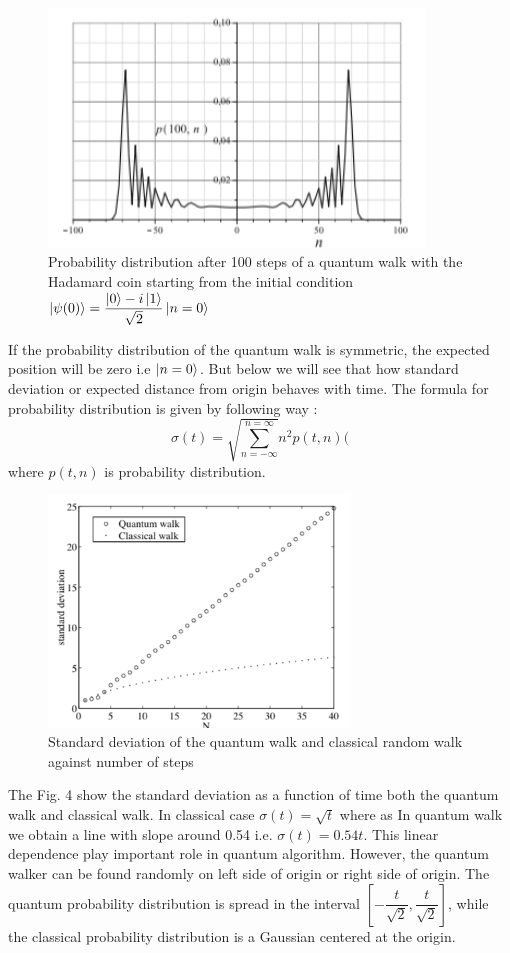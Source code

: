 \documentclass[11 pt]{article}
\theoremstyle{definition}
\theoremstyle{remark}
\newcommand{\di}{i}
\begin{document}
\begin{figure}[htp]
    \centering
    \includegraphics[width = 10cm]{Line_symmetric.png}
    \caption{Probability distribution after 100 steps of a quantum walk with the Hadamard coin starting from the initial condition $\ket{\psi(0)} = \dfrac{\ket{0}- \di\ket{1}}{\sqrt{2}}\ket{n=0}$}
\end{figure}

If the probability distribution of the quantum walk is symmetric, the expected position will be zero i.e $\ket{n=0}$. But below we will see that how standard deviation or expected distance from origin behaves with time. The formula for probability distribution is given by following way :
$$\sigma(t) = \sqrt{\sum_{n = -\infty}^{n=\infty}}n^{2}p(t,n)($$
where $p(t,n)$ is probability distribution.

\begin{figure}[htp]
    \centering
    \includegraphics[width = 8cm]{Variance_Comp.png}
    \caption{Standard deviation of the quantum walk and classical random walk against number of steps}
\end{figure}

The Fig. 4 show the standard deviation as a function of time both the quantum walk and classical walk. In classical case $\sigma(t) = \sqrt{t}$ where as In quantum walk we obtain a line with slope around 0.54 i.e. $\sigma(t) = 0.54t$. This linear dependence play important role in quantum algorithm. However, the quantum walker can be found randomly on left side of origin or right side of origin. The quantum probability distribution is spread in the interval $[-\dfrac{t}{\sqrt{2}},\dfrac{t}{\sqrt{2}}]$, while the classical probability distribution is a Gaussian centered at the origin.  
\end{document}
